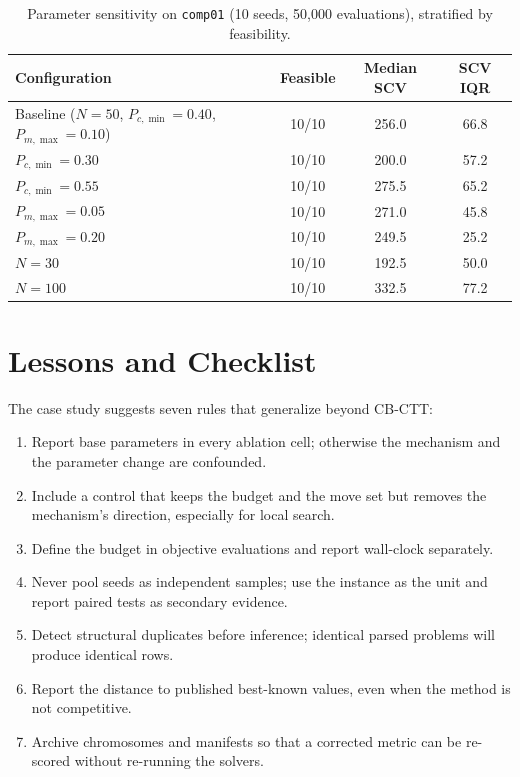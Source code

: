 \documentclass[journal]{IEEEtran}
\newcommand{\code}[1]{\texttt{#1}}
\begin{document}
\begin{table}[!t]
\caption{Parameter sensitivity on \code{comp01} (10 seeds, 50{,}000 evaluations), stratified by feasibility.}
\label{tab:sensitivity}
\centering
\small
\begin{tabular}{l c c c}
\toprule
Configuration & Feasible & Median SCV & SCV IQR \\
\midrule
Baseline ($N=50$, $P_{c,\min}=0.40$, $P_{m,\max}=0.10$) & 10/10 & 256.0 & 66.8 \\
$P_{c,\min}=0.30$ & 10/10 & 200.0 & 57.2 \\
$P_{c,\min}=0.55$ & 10/10 & 275.5 & 65.2 \\
$P_{m,\max}=0.05$ & 10/10 & 271.0 & 45.8 \\
$P_{m,\max}=0.20$ & 10/10 & 249.5 & 25.2 \\
$N=30$ & 10/10 & 192.5 & 50.0 \\
$N=100$ & 10/10 & 332.5 & 77.2 \\
\bottomrule
\end{tabular}
\end{table}

\section{Lessons and Checklist}
The case study suggests seven rules that generalize beyond CB-CTT:
\begin{enumerate}
    \item Report base parameters in every ablation cell; otherwise the mechanism and the parameter change are confounded.
    \item Include a control that keeps the budget and the move set but removes the mechanism's direction, especially for local search.
    \item Define the budget in objective evaluations and report wall-clock separately.
    \item Never pool seeds as independent samples; use the instance as the unit and report paired tests as secondary evidence.
    \item Detect structural duplicates before inference; identical parsed problems will produce identical rows.
    \item Report the distance to published best-known values, even when the method is not competitive.
    \item Archive chromosomes and manifests so that a corrected metric can be re-scored without re-running the solvers.
\end{enumerate}
\end{document}
